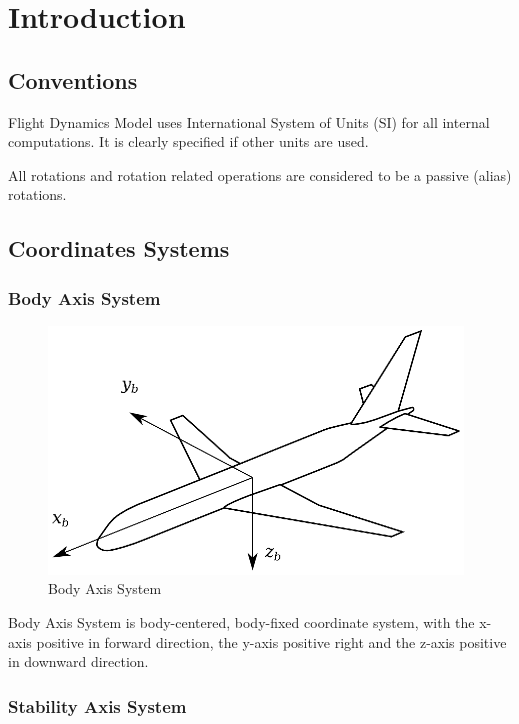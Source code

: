 \chapter{Introduction}


\section{Conventions}

Flight Dynamics Model uses International System of Units (SI) for all internal computations. It is clearly specified if other units are used.

All rotations and rotation related operations are considered to be a passive (alias) rotations.

\section{Coordinates Systems}

\subsection{Body Axis System}

\begin{figure}
  \centering
  \includegraphics[width=110mm]{eps/coordinate_system_BAS.eps}
  \caption{Body Axis System}
\end{figure}

Body Axis System is body-centered, body-fixed coordinate system, with the x\nobreakdash-axis positive in forward direction, the y\nobreakdash-axis positive right and the z\nobreakdash-axis positive in downward direction.

\subsection{Stability Axis System}


